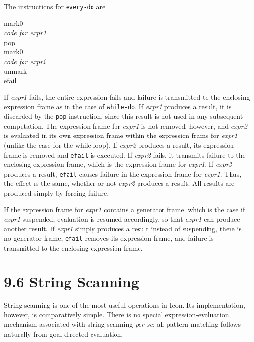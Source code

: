 The instructions for \texttt{every-do} are

\begin{iconcode}
\>mark0\\
\>\textit{code for expr1}\\
\>pop\\
\>mark0\\
\>\textit{code for expr2}\\
\>unmark\\
\>efail
\end{iconcode}



If \textit{expr1} fails, the entire expression fails and failure is
transmitted to the enclosing expression frame as in the case of
\texttt{while-do}. If \textit{expr1} produces a result, it is
discarded by the \texttt{pop} instruction, since this result is not
used in any subsequent computation. The expression frame for
\textit{expr1} is not removed, however, and \textit{expr2} is
evaluated in its own expression frame within the expression frame for
\textit{expr1} (unlike the case for the while loop). If \textit{expr2}
produces a result, its expression frame is removed and \texttt{efail}
is executed. If \textit{expr2} fails, it transmits failure to the
enclosing expression frame, which is the expression frame for
\textit{expr1}. If \textit{expr2} produces a result, \texttt{efail}
causes failure in the expression frame for \textit{expr1}. Thus, the
effect is the same, whether or not \textit{expr2} produces a
result. All results are produced simply by forcing failure.

If the expression frame for \textit{expr1} contains a generator frame,
which is the case if \textit{expr1} suspended, evaluation is resumed
accordingly, so that \textit{expr1} can produce another result. If
\textit{expr1} simply produces a result instead of suspending, there
is no generator frame, \texttt{efail} removes its expression frame,
and failure is transmitted to the enclosing expression frame.


\section[9.6 String Scanning]{9.6 String Scanning}

String scanning is one of the most useful operations in Icon. Its
implementation, however, is comparatively simple.  There is no special
expression-evaluation mechanism associated with string scanning
\textit{per se}; all {\textquotedbl}pattern matching{\textquotedbl}
follows naturally from goal-directed evaluation.

